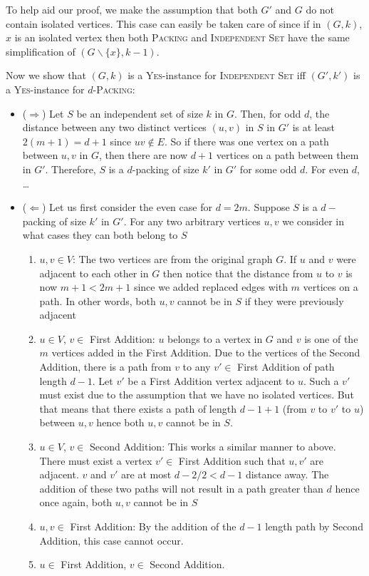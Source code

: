 \documentclass[12pt, a4paper]{article}
\theoremstyle{definition}
\newcommand{\bs}{\backslash}
\begin{document}
To help aid our proof, we make the assumption that both $G'$ and $G$ do not contain isolated vertices. This case can easily be taken care of since if in $(G,k)$, $x$ is an isolated vertex then both \textsc{Packing} and \textsc{Independent Set} have the same simplification of $(G\bs\{x\},k-1)$.

Now we show that $(G, k)$ is a \textsc{Yes}-instance for \textsc{Independent Set} iff $(G', k')$ is a \textsc{Yes}-instance for $d$-\textsc{Packing}:

\begin{itemize}
	\item ($\Rightarrow$) Let $S$ be an independent set of size $k$ in $G$. Then, for odd $d$, the distance between any two distinct vertices $(u, v)$ in $S$ in $G'$ is at least $2(m+1)=d+1$ since $uv \notin E$. So if there was one vertex on a path between $u, v$ in $G$, then there are now $d+1$ vertices on a path between them in $G'$. Therefore, $S$ is a $d$-packing of size $k'$ in $G'$ for some odd $d$. For even $d$, \dots

	\item ($\Leftarrow$) Let us first consider the even case for $d = 2m$. Suppose $S$ is a $d-$packing of size $k'$ in $G'$. For any two arbitrary vertices $u,v$ we consider in what cases they can both belong to $S$
	\begin{enumerate}
		\item $u,v \in V$: The two vertices are from the original graph $G$. If $u$ and $v$ were adjacent to each other in $G$ then notice that the distance from $u$ to $v$ is now $m+1 < 2m+1$ since we added replaced edges with $m$ vertices on a path. In other words, both $u,v$ cannot be in $S$ if they were previously adjacent
		\item $u \in V$, $v \in$ First Addition: $u$ belongs to a vertex in $G$ and $v$ is one of the $m$ vertices added in the First Addition. Due to the vertices of the Second Addition, there is a path from $v$ to any $v' \in$ First Addition of path length $d-1$. Let $v'$ be a First Addition vertex adjacent to $u$. Such a $v'$ must exist due to the assumption that we have no isolated vertices. But that means that there exists a path of length $d-1 + 1$ (from $v$ to $v'$ to $u$) between $u,v$ hence both $u,v$ cannot be in $S$.
		\item $u \in V$, $v \in $ Second Addition: This works a similar manner to above. There must exist a vertex $v' \in $ First Addition such that $u, v'$ are adjacent. $v$ and $v'$ are at most $d-2 / 2 < d - 1$ distance away. The addition of these two paths will not result in a path greater than $d$ hence once again, both $u,v$ cannot be in $S$
		\item $u,v \in$ First Addition: By the addition of the $d-1$ length path by Second Addition, this case cannot occur.
		\item $u \in$ First Addition, $v \in$ Second Addition.
	\end{enumerate}
\end{itemize}
\end{document}
